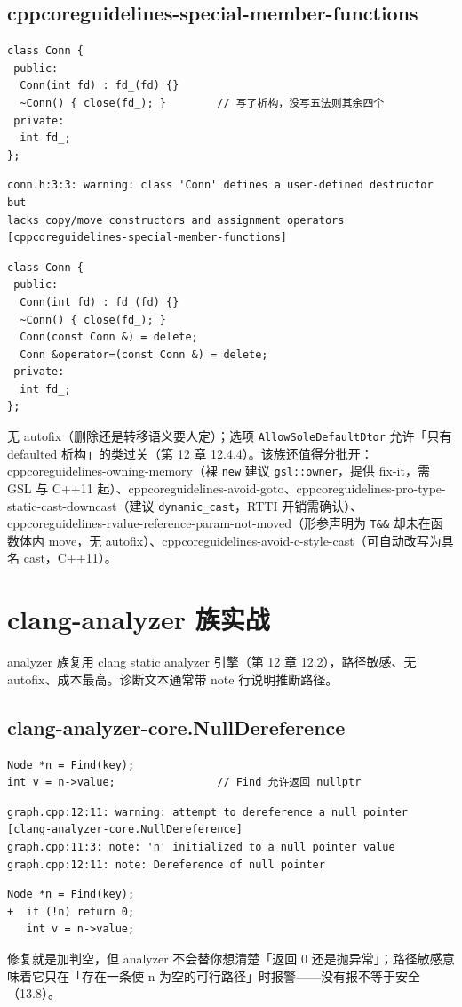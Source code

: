 \documentclass[12pt,a4paper,fontset=fandol]{ctexbook}
\newcommand{\cpp}[1]{C++#1}
\newcommand{\Tp}[1]{\texttt{#1}}
\begin{document}
\subsection{cppcoreguidelines-special-member-functions}\label{sec:ch13-s5d}
\begin{lstlisting}[style=cppstyle]
class Conn {
 public:
  Conn(int fd) : fd_(fd) {}
  ~Conn() { close(fd_); }        // 写了析构，没写五法则其余四个
 private:
  int fd_;
};
\end{lstlisting}
\begin{lstlisting}[style=shellstyle]
conn.h:3:3: warning: class 'Conn' defines a user-defined destructor but
lacks copy/move constructors and assignment operators [cppcoreguidelines-special-member-functions]
\end{lstlisting}
\begin{lstlisting}[style=cppstyle]
class Conn {
 public:
  Conn(int fd) : fd_(fd) {}
  ~Conn() { close(fd_); }
  Conn(const Conn &) = delete;
  Conn &operator=(const Conn &) = delete;
 private:
  int fd_;
};
\end{lstlisting}
无 autofix（删除还是转移语义要人定）；选项 \texttt{AllowSoleDefaultDtor} 允许「只有 defaulted 析构」的类过关（第 12 章 12.4.4）。该族还值得分批开：cppcoreguidelines-owning-memory（裸 \texttt{new} 建议 \Tp{gsl::owner}，提供 fix-it，需 GSL 与 \cpp{11} 起）、cppcoreguidelines-avoid-goto、cppcoreguidelines-pro-type-static-cast-downcast（建议 \texttt{dynamic\_cast}，RTTI 开销需确认）、cppcoreguidelines-rvalue-reference-param-not-moved（形参声明为 \texttt{T\&\&} 却未在函数体内 move，无 autofix）、cppcoreguidelines-avoid-c-style-cast（可自动改写为具名 cast，\cpp{11}）。

\section{clang-analyzer 族实战}\label{sec:ch13-s6}
analyzer 族复用 clang static analyzer 引擎（第 12 章 12.2），路径敏感、无 autofix、成本最高。诊断文本通常带 note 行说明推断路径。
\subsection{clang-analyzer-core.NullDereference}\label{sec:ch13-s6a}
\begin{lstlisting}[style=cppstyle]
Node *n = Find(key);
int v = n->value;                // Find 允许返回 nullptr
\end{lstlisting}
\begin{lstlisting}[style=shellstyle]
graph.cpp:12:11: warning: attempt to dereference a null pointer [clang-analyzer-core.NullDereference]
graph.cpp:11:3: note: 'n' initialized to a null pointer value
graph.cpp:12:11: note: Dereference of null pointer
\end{lstlisting}
\begin{lstlisting}[style=diffstyle]
   Node *n = Find(key);
+  if (!n) return 0;
   int v = n->value;
\end{lstlisting}
修复就是加判空，但 analyzer 不会替你想清楚「返回 0 还是抛异常」；路径敏感意味着它只在「存在一条使 n 为空的可行路径」时报警——没有报不等于安全（13.8）。
\end{document}
